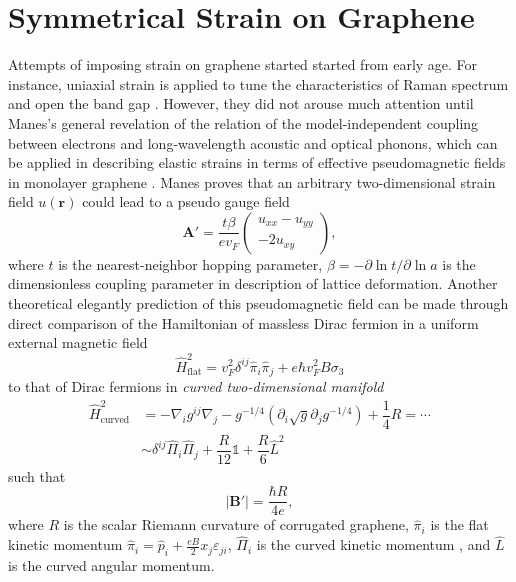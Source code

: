 \documentclass[bachelor,english,numbers]{ustcthesis}
\begin{document}
	\section{Symmetrical Strain on Graphene}
		\indent\par Attempts of imposing strain on graphene started started from early age. For instance, uniaxial strain is applied to tune the characteristics of Raman spectrum and open the band gap \cite{ni2008uniaxial,farjam2009comment}. However, they did not arouse much attention until Manes's general revelation of the relation of the model-independent coupling between electrons and long-wavelength acoustic and optical phonons, which can be applied in describing elastic strains in terms of effective pseudomagnetic fields in monolayer graphene \cite{manes2007symmetry,neto2009electronic}. Manes proves that an arbitrary two-dimensional strain field $u(\bm{r})$ could lead to a pseudo gauge field
		\begin{equation}\label{1.1.1}
			\bm{A'}=\dfrac{t\beta}{ev_F}\left(\begin{array}{c}u_{xx}-u_{yy}\\-2u_{xy}\end{array}\right),
		\end{equation}
		where $t$ is the nearest-neighbor hopping parameter, $\beta=-\partial\ln t/\partial\ln a$ is the dimensionless coupling parameter in description of lattice deformation. Another theoretical elegantly prediction of this pseudomagnetic field can be made through direct comparison of the Hamiltonian of massless Dirac fermion in a uniform external magnetic field 
		\begin{equation}\label{1.1.2}
			\hat{H}^2_{\text{flat}}=v_F^2\delta^{ij}\hat{\pi}_i\hat{\pi}_j+e\hbar v_F^2B\sigma_3
		\end{equation}
		to that of Dirac fermions in \emph{curved two-dimensional manifold} \cite{castro2017pseudomagnetic}
		\begin{align*}
			\hat{H}_{\text{curved}}^2&=-\nabla_ig^{ij}\nabla_j-g^{-1/4}(\partial_i\sqrt{g}\partial_jg^{-1/4})+\dfrac{1}{4}R=\cdots\\
			&\sim\delta^{ij}\hat{\Pi}_i\hat{\Pi}_j+\dfrac{R}{12}\mathds{1}+\dfrac{R}{6}\hat{L}^2
		\end{align*}
		such that
		\begin{equation}\label{1.1.4}
			|\bm{B'}|=\dfrac{\hbar R}{4e},
		\end{equation}
		where $R$ is the scalar Riemann curvature of corrugated graphene, $\hat{\pi}_i$ is the flat kinetic momentum $\hat{\pi}_i=\hat{p}_i+\frac{eB}{2}x_j\varepsilon_{ji}$, $\hat{\Pi}_i$ is the curved kinetic momentum , and $\hat{L}$ is the curved angular momentum.\par
		
\end{document}
